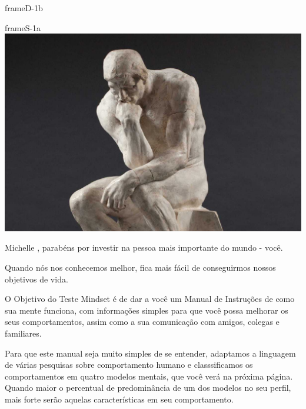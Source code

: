 \documentclass[14pt]{extreport}
\begin{document}
%

\texto

\pagestyle{empty}
\begingroup
  \null
  \newpage
\endgroup



\ClearShipoutPicture

\begin{dynamiccontents*}{frameD-1b}
\end{dynamiccontents*}

\pagestyle{empty}

\newpage

\begin{staticcontents*}{frameS-1a}
\includegraphics[width=210mm]{img/fig1.jpg}
\end{staticcontents*}

\hfill
\vspace{100mm}

{Michelle }, parabéns por investir na pessoa mais importante do mundo - você.

Quando nós nos conhecemos melhor, fica mais fácil de conseguirmos nossos objetivos de vida.

O Objetivo do Teste Mindset é de dar a você um Manual de Instruções de como sua mente funciona, com informações simples para que você possa melhorar os seus comportamentos, assim como a sua comunicação com amigos, colegas e familiares.

Para que este manual seja muito simples de se entender, adaptamos a linguagem de várias pesquisas sobre comportamento humano e classsificamos os comportamentos em quatro modelos mentais, que você verá na próxima página.  Quando maior o percentual de predominância de um dos modelos no seu perfil, mais forte serão aquelas características em seu comportamento.  
\end{document}
